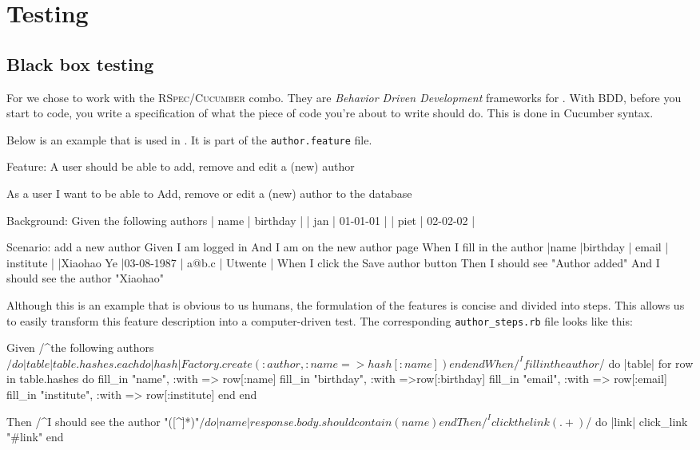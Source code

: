 \chapter{Testing}

\section{Black box testing}

For \briareos{} we chose to work with the \textsc{RSpec/Cucumber} combo. They are \emph{Behavior Driven Development} frameworks for \ror{}. With BDD, before you start to code, you write a specification of what the piece of code you're about to write should do. This is done in Cucumber syntax.

Below is an example that is used in \briareos{}. It is part of the \texttt{author.feature} file.

\begin{listing}[5]{1}
Feature: A user should be able to add, remove and edit a (new) author

As a user
I want to be able to
Add, remove or edit a (new) author to the database

Background:
        Given the following authors
        | name  | birthday |
        | jan   | 01-01-01 |
        | piet  | 02-02-02 |

Scenario: add a new author
        Given I am logged in
        And I am on the new author page
        When I fill in the author
        |name           |birthday       | email | institute |
        |Xiaohao Ye     |03-08-1987     | a@b.c | Utwente   |
        When I click the Save author button
        Then I should see "Author added"
        And I should see the author "Xiaohao"
\end{listing}

Although this is an example that is obvious to us humans, the formulation of the features is concise and divided into steps. This allows us to easily transform this feature description into a computer-driven test. The corresponding \texttt{author\_steps.rb} file looks like this:

\begin{listing}[5]{1}
Given /^the following authors$/ do |table|
  table.hashes.each do |hash|
        Factory.create(:author, :name => hash[:name])
  end
end

When /^I fill in the author$/ do |table|
  for row in table.hashes do
    fill_in "name", :with => row[:name]
        fill_in "birthday", :with =>row[:birthday]
        fill_in "email", :with => row[:email]
        fill_in "institute", :with => row[:institute]
  end
end

Then /^I should see the author "([^\"]*)"$/ do |name|
  response.body.should contain(name)
end

Then /^I click the link (.+)$/ do |link|
  click_link "#{link}"
end
\end{listing}

